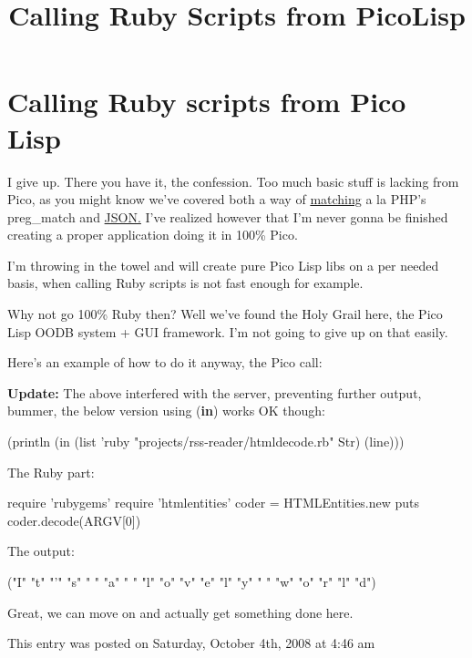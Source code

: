 \title*{Calling Ruby Scripts from PicoLisp}

\maketitle

\section{Calling Ruby scripts from Pico Lisp}
\label{sec:calling-ruby-scripts}

I give up. There you have it, the confession. Too much basic stuff is
lacking from Pico, as you might know we've covered both a way of
\href{http://www.prodevtips.com/2008/07/01/regular-expressions-in-pico-lisp/}{matching} a la PHP's preg\_match and \href{http://www.prodevtips.com/2008/09/11/pico-lisp-and-json/}{JSON.} I've realized however that
I'm never gonna be finished creating a proper application doing it in
100\% Pico.

I'm throwing in the towel and will create pure Pico Lisp libs on a per
needed basis, when calling Ruby scripts is not fast enough for example.

Why not go 100\% Ruby then? Well we've found the Holy Grail here, the
Pico Lisp OODB system + GUI framework. I'm not going to give up on that
easily.

Here's an example of how to do it anyway, the Pico call:



\textbf{Update:} The above interfered with the server, preventing further
output, bummer, the below version using (\textbf{in}) works OK though:


\begin{wideverbatim}
(println
     (in (list 'ruby "projects/rss-reader/htmldecode.rb" Str) (line)))
\end{wideverbatim}

The Ruby part:


\begin{wideverbatim}
require 'rubygems'
require 'htmlentities'
coder = HTMLEntities.new
puts coder.decode(ARGV[0])
\end{wideverbatim}

The output:


\begin{wideverbatim}
("I" "t" "’" "s" " " "a" " " "l" "o" "v" "e" "l" "y" " " "w" "o" "r" "l" "d")
\end{wideverbatim}

Great, we can move on and actually get something done here.

This entry was posted on Saturday, October 4th, 2008 at 4:46 am 


